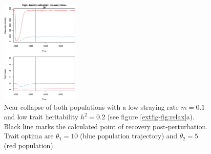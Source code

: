 \documentclass{revtex4}
\begin{document}
\begin{figure}
  \captionsetup{justification=raggedright,
singlelinecheck=false
}
\centering
\includegraphics[width=0.35\textwidth]{figs2/fig_relax_both_lowh.pdf}
\caption{
Near collapse of both populations with a low straying rate $m=0.1$ and low trait heritability $h^2=0.2$ (see figure \ref{extfig-fig:relax}a).
Black line marks the calculated point of recovery post-perturbation.
Trait optima are $\theta_1 = 10$ (blue population trajectory) and $\theta_2 = 5$ (red population).
} \label{fig:relaxtraj_bothlh}
\end{figure}




\end{document}
